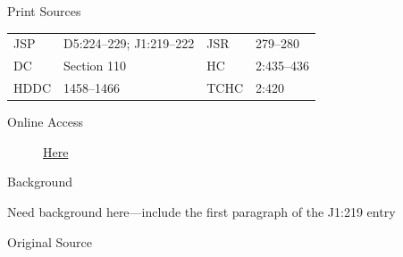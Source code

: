 			\begin{description}
					\item[Print Sources]
				\end{description}

					\begin{tabular}{p{0.5in}p{1in}p{0.5in}p{1in}}
					JSP	 	& D5:224--229; J1:219--222		& JSR 		& 279--280 \\
					DC	 	& Section 110		& HC 		& 2:435--436 \\
					HDDC 	& 1458--1466		& TCHC 		& 2:420 \\
					\end{tabular}
				
				\begin{description}
					\item[Online Access] \href{https://www.josephsmithpapers.org/paper-summary/visions-3-april-1836-dc-110/1}{Here}
				\end{description}
				
				\begin{description}
					\item[Background]
				\end{description}
				
					
					Need background here---include the first paragraph of the J1:219 entry
				
				\begin{description}
					\item[Original Source]
				\end{description}
				
				

